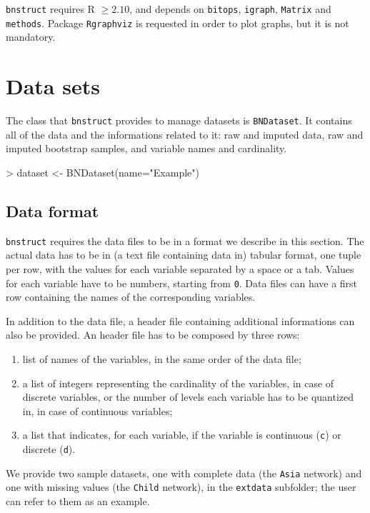 \documentclass{article}
\newcommand{\Robject}[1]{{\texttt{#1}}}
\newcommand{\Rpackage}[1]{{\texttt{#1}}}
\begin{document}
\Rpackage{bnstruct} requires R $\geq 2.10$,
and depends on \Rpackage{bitops}, \Rpackage{igraph}, \Rpackage{Matrix} and \Rpackage{methods}.
Package \Rpackage{Rgraphviz} is requested in order to plot graphs, but it is not mandatory.


\section{Data sets}
The class that \Rpackage{bnstruct} provides to manage datasets is \Robject{BNDataset}.
It contains all of the data and the informations related to it: raw and imputed data, raw and imputed
bootstrap samples, and variable names and cardinality.

\begin{Schunk}
\begin{Sinput}
> dataset <- BNDataset(name="Example")
\end{Sinput}
\end{Schunk}


\subsection{Data format}
\Rpackage{bnstruct} requires the data files to be in a format we describe in this section. 
The actual data has to be in (a text file containing data in) tabular format, one tuple per row,
with the values for each variable separated by a space or a tab. Values for each variable have to be
numbers, starting from \texttt{0}. Data files can have a first row containing the names of the corresponding variables.

In addition to the data file, a header file containing additional informations can also be provided.
An header file has to be composed by three rows:
\begin{enumerate}
\item list of names of the variables, in the same order of the data file;
\item a list of integers representing the cardinality of the variables, in case of discrete variables,
      or the number of levels each variable has to be quantized in, in case of continuous variables;
\item a list that indicates, for each variable, if the variable is continuous (\texttt{c}) or discrete (\texttt{d}).
\end{enumerate}

We provide two sample datasets, one with complete data (the \texttt{Asia} network) and one with missing values
(the \texttt{Child} network), in the \texttt{extdata} subfolder;
the user can refer to them as an example.
\end{document}
